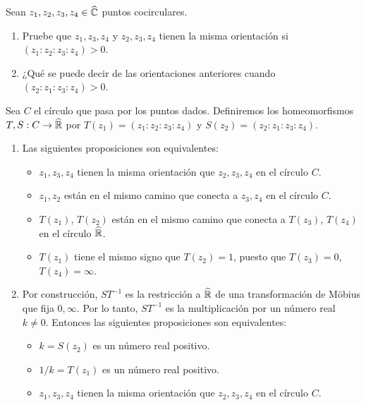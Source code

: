 \begin{exercise}
Sean $z_1, z_2, z_3, z_4 \in \widehat {\mathbb C}$ puntos cocirculares.

\begin{enumerate}[label=(\alph*)]
    \item Pruebe que $z_1, z_3, z_4$ y $z_2, z_3, z_4$ tienen la misma orientación si $(z_1 : z_2 : z_3 : z_4) > 0$.
    \item ¿Qué se puede decir de las orientaciones anteriores cuando $(z_2 : z_1 : z_3 : z_4) > 0$.
\end{enumerate}
\end{exercise}

\begin{solution}
Sea $C$ el círculo que pasa por los puntos dados. Definiremos los homeomorfismos $T, S : C \to \widehat {\mathbb R}$ por $T(z_1) = (z_1 : z_2 : z_3 : z_4)$ y $S(z_2) = (z_2 : z_1 : z_3 : z_4)$.

\begin{enumerate}[label=(\alph*)]
    \item Las siguientes proposiciones son equivalentes:
    \begin{itemize}
        \item $z_1, z_3, z_4$ tienen la misma orientación que $z_2, z_3, z_4$ en el círculo $C$.
        \item $z_1, z_2$ están en el mismo camino que conecta a $z_3, z_4$ en el círculo $C$.
        \item $T(z_1)$, $T(z_2)$ están en el mismo camino que conecta a $T(z_3)$, $T(z_4)$ en el círculo $\widehat {\mathbb R}$.
        \item $T(z_1)$ tiene el mismo signo que $T(z_2) = 1$, puesto que $T(z_3) = 0$, $T(z_4) = \infty$.
    \end{itemize}
    
    \item Por construcción, $ST^{-1}$ es la restricción a $\widehat {\mathbb R}$ de una transformación de Möbius que fija $0, \infty$. Por lo tanto, $ST^{-1}$ es la multiplicación por un número real $k \ne 0$. Entonces las siguientes proposiciones son equivalentes:
    \begin{itemize}
        \item $k = S(z_2)$ es un número real positivo.
        \item $1/k = T(z_1)$ es un número real positivo.
        \item $z_1, z_3, z_4$ tienen la misma orientación que $z_2, z_3, z_4$ en el círculo $C$.
    \end{itemize}
\end{enumerate}
\end{solution}
